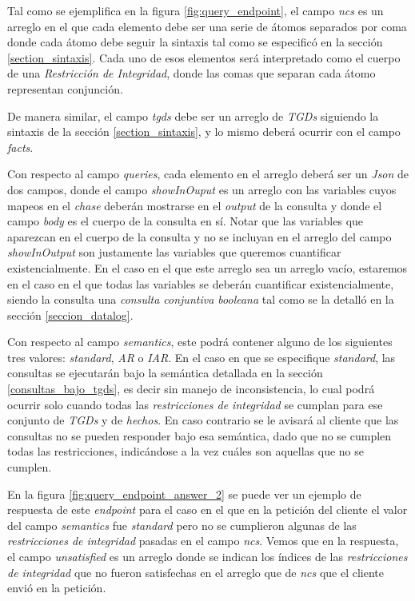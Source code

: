 \documentclass[11pt,a4paper,twoside]{tesis}
\begin{document}
Tal como se ejemplifica en la figura \ref{fig:query_endpoint}, el campo \textit{ncs} es un arreglo en el que cada elemento debe ser una serie de átomos separados por coma donde cada átomo debe seguir la sintaxis tal como se especificó en la sección \ref{section_sintaxis}. Cada uno de esos elementos será interpretado como el cuerpo de una \textit{Restricción de Integridad}, donde las comas que separan cada átomo representan conjunción.

De manera similar, el campo \textit{tgds} debe ser un arreglo de \textit{TGDs} siguiendo la sintaxis de la sección \ref{section_sintaxis}, y lo mismo deberá ocurrir con el campo \textit{facts}. 

Con respecto al campo \textit{queries}, cada elemento en el arreglo deberá ser un \textit{Json} de dos campos, donde el campo \textit{showInOuput} es un arreglo con las variables cuyos mapeos en el \textit{chase} deberán mostrarse en el \textit{output} de la consulta y donde el campo \textit{body} es el cuerpo de la consulta en sí. Notar que las variables que aparezcan en el cuerpo de la consulta y no se incluyan en el arreglo del campo \textit{showInOutput} son justamente las variables que queremos cuantificar existencialmente. En el caso en el que este arreglo sea un arreglo vacío, estaremos en el caso en el que todas las variables se deberán cuantificar existencialmente, siendo la consulta una \textit{consulta conjuntiva booleana} tal como se la detalló en la sección \ref{seccion_datalog}.
    
Con respecto al campo \textit{semantics}, este podrá contener alguno de los siguientes tres valores: \textit{standard}, \textit{AR} o \textit{IAR}. En el caso en que se especifique \textit{standard}, las consultas se ejecutarán bajo la semántica detallada en la sección \ref{consultas_bajo_tgds}, es decir sin manejo de inconsistencia, lo cual podrá ocurrir solo cuando todas las \textit{restricciones de integridad} se cumplan para ese conjunto de \textit{TGDs} y de \textit{hechos}. En caso contrario se le avisará al cliente que las consultas no se pueden responder bajo esa semántica, dado que no se cumplen todas las restricciones, indicándose a la vez cuáles son aquellas que no se cumplen.

En la figura \ref{fig:query_endpoint_answer_2} se puede ver un ejemplo de respuesta de este \textit{endpoint} para el caso en el que en la petición del cliente el valor del campo \textit{semantics} fue \textit{standard} pero no se cumplieron algunas de las \textit{restricciones de integridad} pasadas en el campo \textit{ncs}. Vemos que en la respuesta, el campo \textit{unsatisfied} es un arreglo donde se indican los índices de las \textit{restricciones de integridad} que no fueron satisfechas en el arreglo que de \textit{ncs} que el cliente envió en la petición. 
\end{document}
